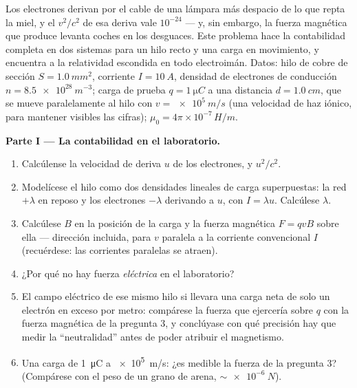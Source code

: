 \begin{problem}\label{pb:b3:covariant-electromagnetism:1}
Los electrones derivan por el cable de una lámpara más despacio de lo que
repta la miel, y el $v^2/c^2$ de esa deriva vale $10^{-24}$ --- y, sin
embargo, la fuerza magnética que produce levanta coches en los desguaces.
Este problema hace la contabilidad completa en dos sistemas para un hilo
recto y una carga en movimiento, y encuentra a la relatividad escondida en
todo electroimán. Datos: hilo de cobre de sección $S = \qty{1.0}{mm^2}$,
corriente $I = \qty{10}{A}$, densidad de electrones de conducción
$n = \qty{8.5e28}{m^{-3}}$; carga de prueba
$q = \qty{1}{\micro C}$ a una distancia $d = \qty{1.0}{cm}$, que se mueve
paralelamente al hilo con $v = \qty{e5}{m/s}$ (una velocidad de haz iónico,
para mantener visibles las cifras); $\mu_0 = 4\pi\times10^{-7}\,\unit{H/m}$.

\medskip\noindent\textbf{Parte I --- La contabilidad en el laboratorio.}
\begin{enumerate}
  \item Calcúlense la velocidad de deriva $u$ de los electrones, y $u^2/c^2$.
  \item Modelícese el hilo como dos densidades lineales de carga
        superpuestas: la red $+\lambda$ en reposo y los electrones
        $-\lambda$ derivando a $u$, con $I = \lambda u$. Calcúlese $\lambda$.
  \item Calcúlese $B$ en la posición de la carga y la fuerza magnética
        $F = qvB$ sobre ella --- dirección incluida, para $v$ paralela a
        la corriente convencional $I$ (recuérdese: las corrientes paralelas
        se atraen).
  \item ¿Por qué no hay fuerza \emph{eléctrica} en el laboratorio?
  \item El campo eléctrico de ese mismo hilo si llevara una carga neta de
        solo un electrón en exceso por metro: compárese la fuerza que
        ejercería sobre $q$ con la fuerza magnética de la pregunta 3, y
        conclúyase con qué precisión hay que medir la ``neutralidad'' antes
        de poder atribuir el magnetismo.
  \item Una carga de \qty{1}{\micro C} a \qty{e5}{m/s}: ¿es medible la
        fuerza de la pregunta 3? (Compárese con el peso de un grano de
        arena, $\sim\qty{e-6}{N}$).
\end{enumerate}


\end{problem}
